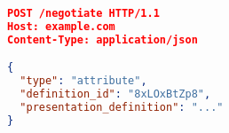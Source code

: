 

\begin{lstlisting}[language=json,firstnumber=1]
POST /negotiate HTTP/1.1
Host: example.com
Content-Type: application/json

{
  "type": "attribute",
  "definition_id": "8xLOxBtZp8",
  "presentation_definition": "..."
}
\end{lstlisting}